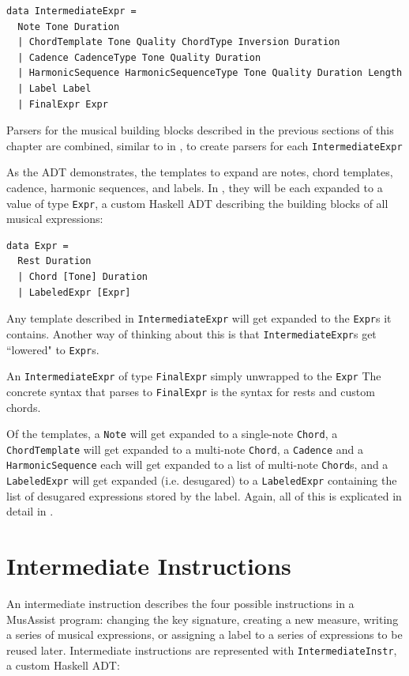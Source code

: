 \documentclass{report}
\begin{document}
\begin{verbatim}
data IntermediateExpr = 
  Note Tone Duration
  | ChordTemplate Tone Quality ChordType Inversion Duration
  | Cadence CadenceType Tone Quality Duration
  | HarmonicSequence HarmonicSequenceType Tone Quality Duration Length 
  | Label Label
  | FinalExpr Expr
\end{verbatim}

Parsers for the musical building blocks described in the previous sections of this chapter are combined, similar to in , to create parsers for each \verb.IntermediateExpr.

As the ADT demonstrates, the templates to expand are notes, chord templates, cadence, harmonic sequences, and labels. In , they will be each expanded to a value of type \verb.Expr., a custom Haskell ADT describing the building blocks of all musical expressions:

\begin{verbatim}
data Expr = 
  Rest Duration
  | Chord [Tone] Duration
  | LabeledExpr [Expr]
\end{verbatim}

Any template described in \verb.IntermediateExpr. will get expanded to the \verb.Expr.s it contains. Another way of thinking about this is that \verb.IntermediateExpr.s get ``lowered" to \verb.Expr.s.

An \verb.IntermediateExpr. of type \verb.FinalExpr. simply unwrapped to the \verb.Expr. The concrete syntax that parses to \verb.FinalExpr. is the syntax for rests and custom chords. 

Of the templates, a \verb.Note. will get expanded to a single-note \verb.Chord., a \verb.ChordTemplate. will get expanded to a multi-note \verb.Chord., a \verb.Cadence. and a \verb.HarmonicSequence. each will get expanded to a list of multi-note \verb.Chord.s, and a \verb.LabeledExpr. will get expanded (i.e. desugared) to a \verb.LabeledExpr. containing the list of desugared expressions stored by the label. Again, all of this is explicated in detail in .

\section{Intermediate Instructions}

An intermediate instruction describes the four possible instructions in a MusAssist program: changing the key signature, creating a new measure, writing a series of musical expressions, or assigning a label to a series of expressions to be reused later. Intermediate instructions are represented with \verb.IntermediateInstr., a custom Haskell ADT:
\end{document}
